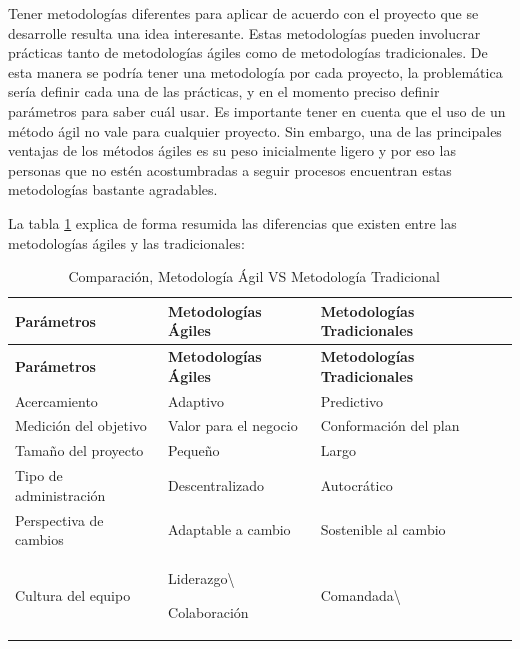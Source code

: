 {    Tener metodologías diferentes para aplicar de acuerdo con el proyecto que se desarrolle resulta una idea interesante. Estas metodologías pueden involucrar prácticas tanto de metodologías ágiles como de metodologías tradicionales. De esta manera se podría tener una metodología por cada proyecto, la problemática sería definir cada una de las prácticas, y en el momento preciso definir parámetros para saber cuál usar.
    Es importante tener en cuenta que el uso de un método ágil no vale para cualquier proyecto. Sin embargo, una de las principales ventajas de los métodos ágiles es su peso inicialmente ligero y por eso las personas que no estén acostumbradas a seguir procesos encuentran estas metodologías bastante agradables.
    
    La tabla \ref{tab:metodologias} explica de forma resumida las diferencias que existen entre las metodologías ágiles y las tradicionales:
    
    
    \begin{longtable}{|p{5cm}|p{5cm}|p{5cm}|}
    	\caption{Comparación, Metodología Ágil VS Metodología Tradicional ~\citep{awad2005agile_v_traditional}} \label{tab:metodologias}\\
    	
    	\hline
    	\rowcolor[HTML]{CBCEFB} 
    	\textbf{Parámetros} & \textbf{Metodologías Ágiles} & \textbf{Metodologías Tradicionales} \\
    	\hline
    	\endfirsthead
    	
    	\hline
    	\rowcolor[HTML]{CBCEFB} 
    	\textbf{Parámetros} & \textbf{Metodologías Ágiles} & \textbf{Metodologías Tradicionales} \\
    	\hline
    	\endhead
    	
    	Acercamiento & Adaptivo & Predictivo \\ 
    	\hline
    	\rowcolor[HTML]{EDEBF1}
    	Medición del objetivo & Valor para el negocio & Conformación del plan \\ 
    	\hline
    	Tamaño del proyecto & Pequeño & Largo \\ 
    	\hline
    	\rowcolor[HTML]{EDEBF1}
    	Tipo de administración & Descentralizado & Autocrático \\ 
    	\hline
    	Perspectiva de cambios & Adaptable a cambio & Sostenible al cambio \\ 
    	\hline
    	\rowcolor[HTML]{EDEBF1}
    	Cultura del equipo & Liderazgo\textbackslash 
		
		Colaboración & Comandada\textbackslash 
		

\end{longtable}}
